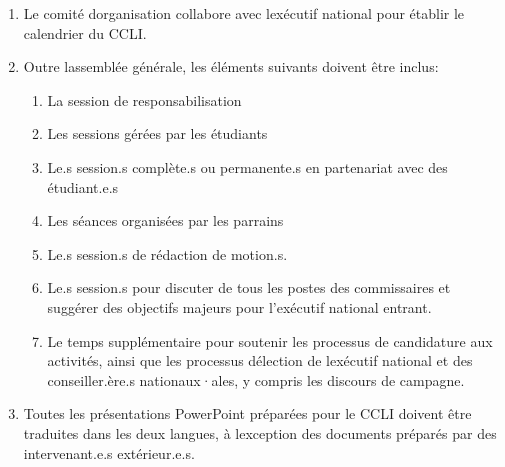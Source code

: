 \begin{enumerate}
 \item
  Le comité d\textquotesingle organisation collabore avec l\textquotesingle exécutif national pour établir le calendrier du CCLI.
 \item
  Outre l\textquotesingle assemblée générale, les éléments suivants doivent être inclus:

  \begin{enumerate}
   \item
    La session de responsabilisation
   \item
    Les sessions gérées par les étudiants
   \item
    Le.s session.s complète.s ou permanente.s en partenariat avec des étudiant.e.s
   \item
    Les séances organisées par les parrains
   \item
    Le.s session.s de rédaction de motion.s.
   \item
    Le.s session.s pour discuter de tous les postes des commissaires et suggérer des objectifs majeurs pour l'exécutif national entrant.
   \item
    Le temps supplémentaire pour soutenir les processus de candidature aux activités, ainsi que les processus d\textquotesingle élection de l\textquotesingle exécutif national et des conseiller.ère.s nationaux·ales, y compris les discours de campagne.
  \end{enumerate}
 \item
  Toutes les présentations PowerPoint préparées pour le CCLI doivent être traduites dans les deux langues, à l\textquotesingle exception des documents préparés par des intervenant.e.s extérieur.e.s.
\end{enumerate}

